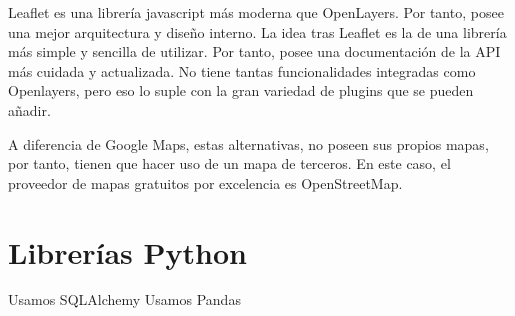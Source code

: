     Leaflet es una librería javascript más moderna que OpenLayers. Por tanto, posee una mejor arquitectura y diseño interno. La idea tras Leaflet es la de una librería más simple y sencilla de utilizar. Por tanto, posee una documentación de la API más cuidada y actualizada. No tiene tantas funcionalidades integradas como Openlayers, pero eso lo suple con la gran variedad de plugins que se pueden añadir.
    
    A diferencia de Google Maps, estas alternativas, no poseen sus propios mapas, por tanto, tienen que hacer uso de un mapa de terceros. En este caso, el proveedor de mapas gratuitos por excelencia es OpenStreetMap\cite{osm}.
  
  \section{Librerías Python}
    Usamos SQLAlchemy
    Usamos Pandas
